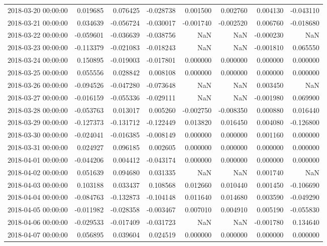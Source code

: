 \begin{tabular}{lrrrrrrr}
2018-03-20 00:00:00 & 0.019685 & 0.076425 & -0.028738 & 0.001500 & 0.002760 & 0.004130 & -0.043110 \\
2018-03-21 00:00:00 & 0.034639 & -0.056724 & -0.030017 & -0.001740 & -0.002520 & 0.006760 & -0.018680 \\
2018-03-22 00:00:00 & -0.059601 & -0.036639 & -0.038756 & NaN & NaN & -0.000230 & NaN \\
2018-03-23 00:00:00 & -0.113379 & -0.021083 & -0.018243 & NaN & NaN & -0.001810 & 0.065550 \\
2018-03-24 00:00:00 & 0.150895 & -0.019003 & -0.017801 & 0.000000 & 0.000000 & 0.000000 & 0.000000 \\
2018-03-25 00:00:00 & 0.055556 & 0.028842 & 0.008108 & 0.000000 & 0.000000 & 0.000000 & 0.000000 \\
2018-03-26 00:00:00 & -0.094526 & -0.047280 & -0.073648 & NaN & NaN & 0.003450 & NaN \\
2018-03-27 00:00:00 & -0.016159 & -0.055336 & -0.029111 & NaN & NaN & -0.001980 & 0.069900 \\
2018-03-28 00:00:00 & -0.053763 & 0.013017 & 0.005260 & -0.002750 & -0.008350 & 0.000880 & 0.016440 \\
2018-03-29 00:00:00 & -0.127373 & -0.131712 & -0.122449 & 0.013820 & 0.016450 & 0.004080 & -0.126800 \\
2018-03-30 00:00:00 & -0.024041 & -0.016385 & -0.008149 & 0.000000 & 0.000000 & 0.001160 & 0.000000 \\
2018-03-31 00:00:00 & 0.024927 & 0.096185 & 0.002605 & 0.000000 & 0.000000 & 0.000000 & 0.000000 \\
2018-04-01 00:00:00 & -0.044206 & 0.004412 & -0.043174 & 0.000000 & 0.000000 & 0.000000 & 0.000000 \\
2018-04-02 00:00:00 & 0.051639 & 0.094680 & 0.031335 & NaN & NaN & 0.001740 & NaN \\
2018-04-03 00:00:00 & 0.103188 & 0.033437 & 0.108568 & 0.012660 & 0.010440 & 0.001450 & -0.106690 \\
2018-04-04 00:00:00 & -0.084763 & -0.132873 & -0.104148 & 0.011640 & 0.014680 & 0.003590 & -0.049290 \\
2018-04-05 00:00:00 & -0.011982 & -0.028358 & -0.003467 & 0.007010 & 0.004910 & 0.005190 & -0.055830 \\
2018-04-06 00:00:00 & -0.029533 & -0.017409 & -0.031723 & NaN & NaN & -0.001780 & 0.134640 \\
2018-04-07 00:00:00 & 0.056895 & 0.039604 & 0.024519 & 0.000000 & 0.000000 & 0.000000 & 0.000000 \\

\end{tabular}
